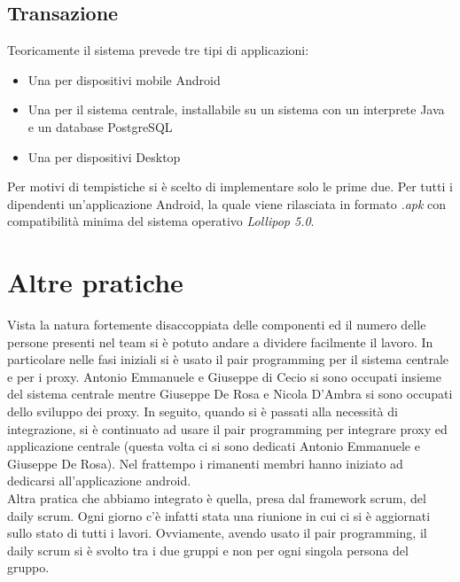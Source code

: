 \subsection{Transazione}
Teoricamente il sistema prevede tre tipi di applicazioni:
\begin{itemize}
	\item Una per dispositivi mobile Android
	\item Una per il sistema centrale, installabile su un sistema con un interprete Java e un database PostgreSQL
	\item Una per dispositivi Desktop 
\end{itemize}
Per motivi di tempistiche si è scelto di implementare solo le prime due. Per tutti i dipendenti un'applicazione Android, la quale viene rilasciata in formato \textit{.apk} con compatibilità minima del sistema operativo \textit{Lollipop 5.0}.

\section{Altre pratiche}
Vista la natura fortemente disaccoppiata delle componenti ed il numero delle persone presenti nel team si è potuto andare a dividere facilmente il lavoro.
In particolare nelle fasi iniziali si è usato il pair programming per il sistema centrale e per i proxy.
Antonio Emmanuele e Giuseppe di Cecio si sono occupati insieme del sistema centrale mentre Giuseppe De Rosa e Nicola D’Ambra si sono occupati dello sviluppo dei proxy.
In seguito, quando si è passati alla necessità di integrazione, si è continuato ad usare il pair programming   per integrare proxy ed applicazione centrale (questa volta ci si sono dedicati Antonio Emmanuele e Giuseppe De Rosa).
Nel frattempo i rimanenti membri hanno iniziato ad dedicarsi all’applicazione  android.
\vspace{0.5cm}
\\Altra pratica che abbiamo integrato è quella, presa dal framework scrum, del daily scrum.
Ogni giorno c’è infatti stata una riunione in cui ci si è aggiornati sullo stato di tutti i lavori.
Ovviamente, avendo usato il pair programming, il daily scrum si è svolto tra i due gruppi e non per ogni singola persona del gruppo.
